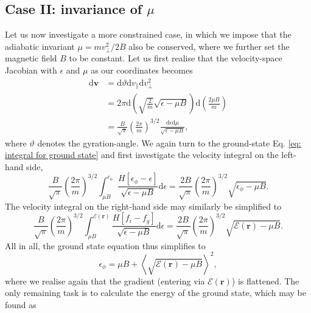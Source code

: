 \subsection{Case II: invariance of $\mu$}
Let us now investigate a more constrained case, in which we impose that the adiabatic invariant $\mu = mv_\perp^2/2B$ also be conserved, where we further set the magnetic field $B$ to be constant. Let us first realise that the velocity-space Jacobian with $\epsilon$ and $\mu$ as our coordinates becomes
\begin{equation}
\begin{aligned}
    \mathrm{d} \boldsymbol{v} &= \mathrm{d}  \vartheta \mathrm{d} v_\parallel \mathrm{d} v_\perp^2 \\
    &= 2\pi \mathrm{d} \left( \sqrt{\frac{2}{m}} \sqrt{\epsilon - \mu B} \right) \mathrm{d} \left( \frac{2\mu B}{m} \right) \\
    &=  \frac{B}{\sqrt{\pi}} \left(\frac{2\pi}{m}\right)^{3/2} \frac{\mathrm{d} \epsilon \mathrm{d} \mu}{\sqrt{\epsilon - \mu B}},
\end{aligned}
\end{equation}
where $\vartheta$ denotes the gyration-angle. We again turn to the ground-state Eq. \eqref{eq: integral for ground state} and first investigate the velocity integral on the left-hand side,
\begin{equation}
    \frac{B}{\sqrt{\pi}} \left(\frac{2\pi}{m}\right)^{3/2}\int_{\mu B}^{\epsilon_\phi} \frac{H \left[ \epsilon_\phi - \epsilon \right]}{\sqrt{\epsilon - \mu B}} \mathrm{d} \epsilon = \frac{2B}{\sqrt{\pi}} \left(\frac{2\pi}{m}\right)^{3/2}\sqrt{\epsilon_\phi - \mu B}.
\end{equation}
The velocity integral on the right-hand side may similarly be simplified to
\begin{equation}
    \frac{B}{\sqrt{\pi}} \left(\frac{2\pi}{m}\right)^{3/2}\int_{\mu B}^{\mathcal{E}(\boldsymbol{r})} \frac{H \left[ f_i - f_g \right]}{\sqrt{\epsilon - \mu B}} \mathrm{d} \epsilon = \frac{2B}{\sqrt{\pi}} \left(\frac{2\pi}{m}\right)^{3/2}\sqrt{\mathcal{E}(\boldsymbol{r}) - \mu B}.
\end{equation}
All in all, the ground state equation thus simplifies to
\begin{equation}
    \epsilon_\phi = \mu B + \left\langle \sqrt{ \mathcal{E}(\boldsymbol{r}) - \mu B} \right\rangle^2,
\end{equation}
where we realise again that the gradient (entering via $\mathcal{E}(\boldsymbol{r})$) is flattened. The only remaining task is to calculate the energy of the ground state, which may be found as
